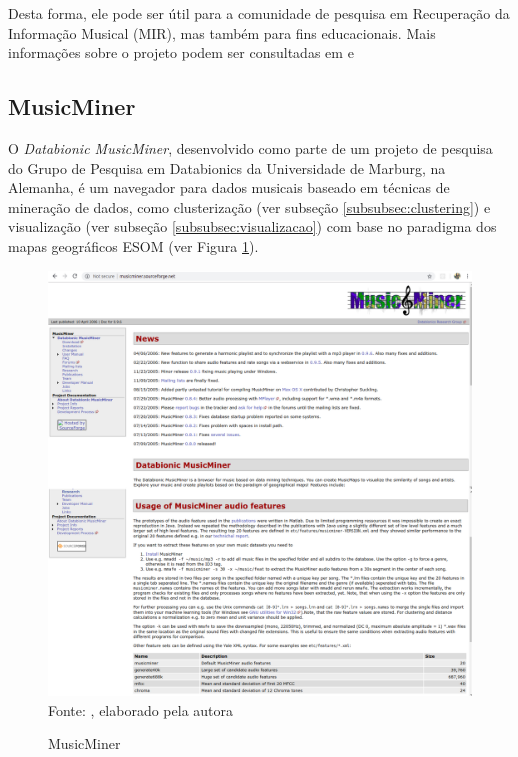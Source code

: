 Desta forma, ele pode ser útil para a comunidade de pesquisa em Recuperação da Informação Musical (MIR), mas também para fins educacionais. Mais informações sobre o projeto podem ser consultadas em \cite{lartillot2007, lartillot2013} e \cite{mirtoolbox}


\subsection{MusicMiner} \label{subsec:musicminer}
O \textit{Databionic MusicMiner}, desenvolvido como parte de um projeto de pesquisa do Grupo de Pesquisa em Databionics da Universidade de Marburg, na Alemanha, é um navegador para dados musicais baseado em técnicas de mineração de dados, como clusterização (ver subseção \ref{subsubsec:clustering}) e visualização (ver subseção \ref{subsubsec:visualizacao}) com base no paradigma dos mapas geográficos ESOM  (ver Figura \ref{fig:musicminer}).

\begin{figure}[!htb]
   \centering
   \caption{MusicMiner}\label{fig:musicminer} 
   \includegraphics[scale=0.25]{figuras/musicminer.png}
   \\Fonte: \cite{musicminer}, elaborado pela autora
\end{figure}


